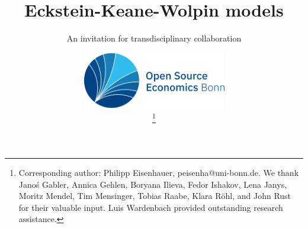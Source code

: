 
\title{Eckstein-Keane-Wolpin models}
\subtitle{An invitation for transdisciplinary collaboration}
\author{\includegraphics[height=2.5cm]{../material/crop-ose-logo.pdf} \vspace{-1.8cm} \\ \hspace{6.1cm}
	\thanks{Corresponding author: Philipp Eisenhauer, peisenha@uni-bonn.de. We thank  Jano\'s Gabler, Annica Gehlen, Boryana Ilieva, Fedor Ishakov, Lena Janys, Moritz Mendel, Tim Mensinger, Tobias Raabe, Klara R\"ohl, and John Rust for their valuable input. Luis Wardenbach provided outstanding research assistance.}}
\date{}
